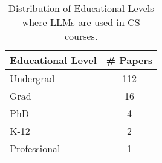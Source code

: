 \begin{table}[ht]
    \centering
    \caption{Distribution of Educational Levels where LLMs are used in CS courses.}
    \begin{tabular}{l c}
        \toprule
        \textbf{Educational Level} & \textbf{\# Papers} \\
        \midrule
		Undergrad & 112 \\
		Grad & 16 \\
		PhD & 4 \\
		K-12 & 2 \\
		Professional & 1 \\
	\bottomrule
    \end{tabular}
    \label{tab:edu_level}
\end{table}